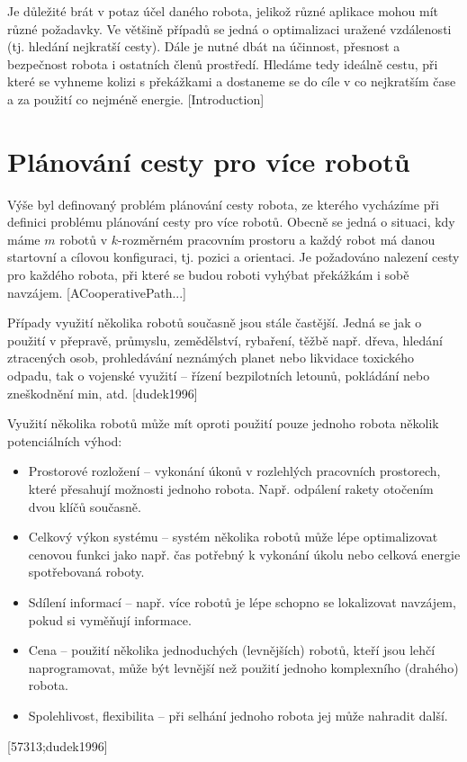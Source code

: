 Je důležité brát v potaz účel daného robota, jelikož různé aplikace mohou mít různé požadavky. Ve většině případů se jedná o optimalizaci uražené vzdálenosti (tj. hledání nejkratší cesty). Dále je nutné dbát na účinnost, přesnost a bezpečnost robota i ostatních členů prostředí. Hledáme tedy ideálně cestu, při které se vyhneme kolizi s překážkami a dostaneme se do cíle v co nejkratším čase a za použití co nejméně energie. [Introduction]



\section{Plánování cesty pro více robotů}
Výše byl definovaný problém plánování cesty robota, ze kterého vycházíme při definici problému plánování cesty pro více robotů. Obecně se jedná o situaci, kdy máme $m$ robotů v $k$-rozměrném pracovním prostoru a každý robot má danou startovní a cílovou konfiguraci, tj. pozici a orientaci. Je požadováno nalezení cesty pro každého robota, při které se budou roboti vyhýbat překážkám i sobě navzájem. [ACooperativePath...]

Případy využití několika robotů současně jsou stále častější. Jedná se jak o použití v přepravě, průmyslu, zemědělství, rybaření, těžbě např. dřeva, hledání ztracených osob, prohledávání neznámých planet nebo likvidace toxického odpadu, tak o vojenské využití -- řízení bezpilotních letounů, pokládání nebo zneškodnění min, atd. [dudek1996]

Využití několika robotů může mít oproti použití pouze jednoho robota několik potenciálních výhod:
\begin{itemize}
	\item Prostorové rozložení -- vykonání úkonů v rozlehlých pracovních prostorech, které přesahují možnosti jednoho robota. Např. odpálení rakety otočením dvou klíčů současně.
	\item Celkový výkon systému -- systém několika robotů může lépe optimalizovat cenovou funkci jako např. čas potřebný k vykonání úkolu nebo celková energie spotřebovaná roboty.
	\item Sdílení informací -- např. více robotů je lépe schopno se lokalizovat navzájem, pokud si vyměňují informace.
	\item Cena -- použití několika jednoduchých (levnějších) robotů, kteří jsou lehčí naprogramovat, může být levnější než použití jednoho komplexního (drahého) robota.
	\item Spolehlivost, flexibilita -- při selhání jednoho robota jej může nahradit další.
\end{itemize}
[57313;dudek1996]


